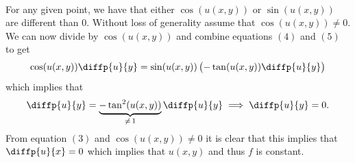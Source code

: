 \documentclass[11pt,a4paper]{article}
\begin{document}
\begin{solution}
\begin{enumerate}
\begin{gather}
  \end{gather}
  For any given point, we have that either $\cos(u(x,y))$ or $\sin(u(x,y))$
  are different than $0$. Without loss of generality assume that
  $\cos(u(x,y)) \neq 0$.
  We can now divide by $\cos(u(x,y))$ and combine equations $(4)$ and $(5)$
  to get
  \[
    \cos(u(x,y)) \diffp{u}{y} =
    \sin(u(x,y)) \del{- \tan(u(x,y)) \diffp{u}{y}}
  \]
  which implies that
  \[
    \diffp{u}{y} =
    \underbrace{- \tan^2(u(x,y))}_{\neq\,1} \diffp{u}{y} \implies
    \diffp{u}{y} = 0.
  \]
  From equation $(3)$ and $\cos(u(x,y)) \neq 0$ it is clear that this
  implies that $\diffp{u}{x} = 0$ which implies that $u(x,y)$ and thus $f$
  is constant.
\setcounter{equation}{0}
\end{enumerate}
\end{solution}
\end{document}
